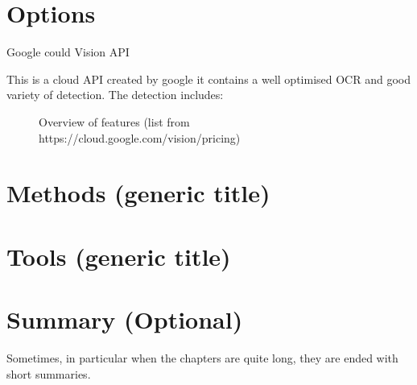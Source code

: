 \section{Options}\label{sec:related-work-(generic-title)}

Google could Vision API

This is a cloud API created by google it contains a well optimised OCR and good variety of detection.
The detection includes:

\begin{figure}[h]
    \caption{Overview of features (list from https://cloud.google.com/vision/pricing)}
    \label{fig:Features}
\end{figure}

\section{Methods (generic title)}\label{sec:methods-(generic-title)}


\section{Tools (generic title)}\label{sec:tools-(generic-title)}


\section{Summary (Optional)}\label{sec:summary-(optional)}

Sometimes, in particular when the chapters are quite long, they are ended with short summaries.
